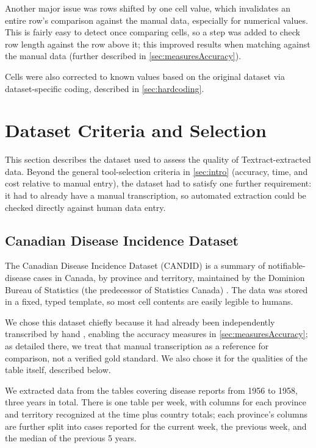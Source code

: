 \documentclass[12pt]{article}
\begin{document}
Another major issue was rows shifted by one cell value, which invalidates an entire row's comparison against the manual data, especially for numerical values. This is fairly easy to detect once comparing cells, so a step was added to check row length against the row above it; this improved results when matching against the manual data (further described in \cref{sec:measuresAccuracy}).

Cells were also corrected to known values based on the original dataset via dataset-specific coding, described in \cref{sec:hardcoding}.



\section{Dataset Criteria and Selection}

This section describes the dataset used to assess the quality of Textract-extracted data. Beyond the general tool-selection criteria in \cref{sec:intro} (accuracy, time, and cost relative to manual entry), the dataset had to satisfy one further requirement: it had to already have a manual transcription, so automated extraction could be checked directly against human data entry.


\subsection{Canadian Disease Incidence Dataset}\label{sec:NDDdetails}

The Canadian Disease Incidence Dataset (CANDID) is a summary of notifiable-disease cases in Canada, by province and territory, maintained by the Dominion Bureau of Statistics (the predecessor of Statistics Canada) \cite{CANDID}. The data was stored in a fixed, typed template, so most cell contents are easily legible to humans.

We chose this dataset chiefly because it had already been independently transcribed by hand \cite{CANDID}, enabling the accuracy measures in \cref{sec:measuresAccuracy}; as detailed there, we treat that manual transcription as a reference for comparison, not a verified gold standard. We also chose it for the qualities of the table itself, described below.

We extracted data from the tables covering disease reports from 1956 to 1958, three years in total. There is one table per week, with columns for each province and territory recognized at the time plus country totals; each province's columns are further split into cases reported for the current week, the previous week, and the median of the previous 5 years.
\end{document}
